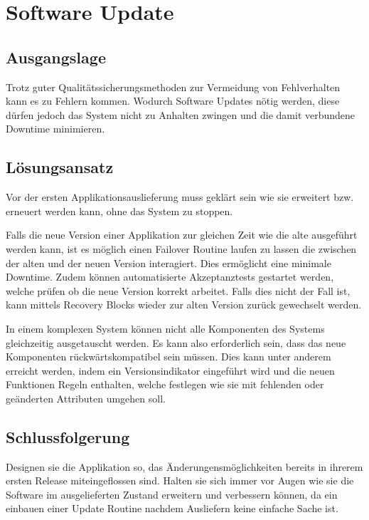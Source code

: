 
\section{Software Update}

\subsection{Ausgangslage}

Trotz guter Qualitätssicherungsmethoden zur Vermeidung von Fehlverhalten kann es zu Fehlern kommen. Wodurch Software Updates nötig werden, diese dürfen jedoch das System nicht zu Anhalten zwingen und die damit verbundene Downtime minimieren.

\subsection{Lösungsansatz}

Vor der ersten Applikationsauslieferung muss geklärt sein wie sie erweitert bzw. erneuert werden kann, ohne das System zu stoppen.

Falls die neue Version einer Applikation zur gleichen Zeit wie die alte ausgeführt werden kann, ist es möglich einen Failover Routine laufen zu lassen die zwischen der alten und der neuen Version interagiert. Dies ermöglicht eine minimale Downtime. Zudem können automatisierte Akzeptanztests gestartet werden, welche prüfen ob die neue Version korrekt arbeitet. Falls dies nicht der Fall ist, kann mittels Recovery Blocks wieder zur alten Version zurück gewechselt werden.

In einem komplexen System können nicht alle Komponenten des Systems gleichzeitig ausgetauscht werden. Es kann also erforderlich sein, dass das neue Komponenten rückwärtskompatibel sein müssen. Dies kann unter anderem erreicht werden, indem ein Versionsindikator eingeführt wird und die neuen Funktionen Regeln enthalten, welche festlegen wie sie mit fehlenden oder geänderten Attributen umgehen soll.

\subsection{Schlussfolgerung}

Designen sie die Applikation so, das Änderungensmöglichkeiten bereits in ihrerem ersten Release miteingeflossen sind. Halten sie sich immer vor Augen wie sie die Software im ausgelieferten Zustand erweitern und verbessern können, da ein einbauen einer Update Routine nachdem Ausliefern keine einfache Sache ist.
